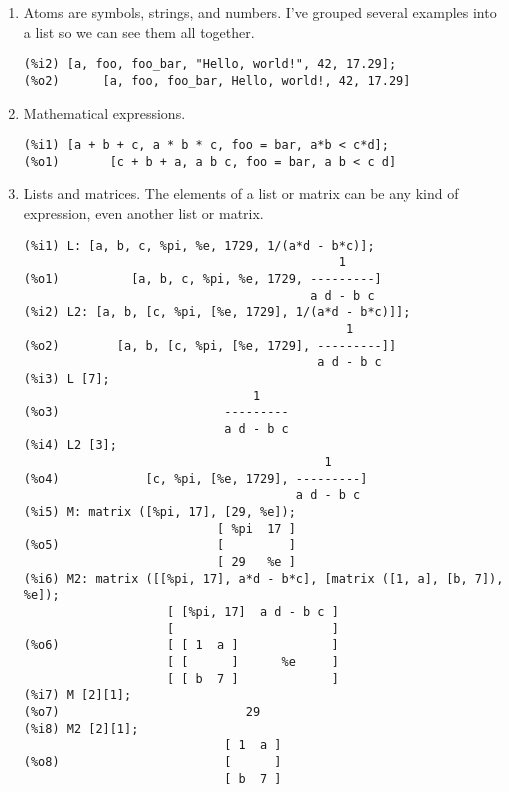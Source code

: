 \documentclass[12pt]{article}
\begin{document}
\begin{enumerate}

\item Atoms are symbols, strings, and numbers.
I've grouped several examples into a list so we can see them all together.

\begin{verbatim}
(%i2) [a, foo, foo_bar, "Hello, world!", 42, 17.29];
(%o2)      [a, foo, foo_bar, Hello, world!, 42, 17.29]
\end{verbatim}

\item Mathematical expressions.

\begin{verbatim}
(%i1) [a + b + c, a * b * c, foo = bar, a*b < c*d];
(%o1)       [c + b + a, a b c, foo = bar, a b < c d]
\end{verbatim}

\item Lists and matrices.
The elements of a list or matrix can be any kind of expression,
even another list or matrix.

\begin{verbatim}
(%i1) L: [a, b, c, %pi, %e, 1729, 1/(a*d - b*c)];
                                            1
(%o1)          [a, b, c, %pi, %e, 1729, ---------]
                                        a d - b c
(%i2) L2: [a, b, [c, %pi, [%e, 1729], 1/(a*d - b*c)]];
                                             1
(%o2)        [a, b, [c, %pi, [%e, 1729], ---------]]
                                         a d - b c
(%i3) L [7];
                                1
(%o3)                       ---------
                            a d - b c
(%i4) L2 [3];
                                          1
(%o4)            [c, %pi, [%e, 1729], ---------]
                                      a d - b c
(%i5) M: matrix ([%pi, 17], [29, %e]);
                           [ %pi  17 ]
(%o5)                      [         ]
                           [ 29   %e ]
(%i6) M2: matrix ([[%pi, 17], a*d - b*c], [matrix ([1, a], [b, 7]), %e]);
                    [ [%pi, 17]  a d - b c ]
                    [                      ]
(%o6)               [ [ 1  a ]             ]
                    [ [      ]      %e     ]
                    [ [ b  7 ]             ]
(%i7) M [2][1];
(%o7)                          29
(%i8) M2 [2][1];
                            [ 1  a ]
(%o8)                       [      ]
                            [ b  7 ]
\end{verbatim}


\end{enumerate}
\end{document}
